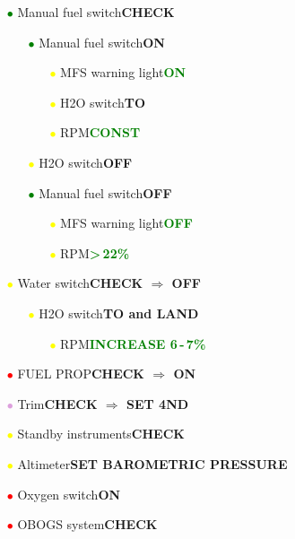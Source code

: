 \documentclass[a4paper,12pt,dvipsnames]{letter}
\newcommand{\button}[1]{\textbf{#1}}
\newcommand{\Deg}{\textdegree{}}
\newcommand{\ok}[1]{\textcolor{Green}{\textbf{#1}}}
\newcommand{\ri}{\textcolor{red}{$\bullet$\;}}
\newcommand{\gi}{\textcolor{Green}{$\bullet$\;}}
\newcommand{\yi}{\textcolor{Yellow}{$\bullet$\;}}
\newcommand{\vi}{\textcolor{Plum}{$\bullet$\;}}
\begin{document}
{\begin{itemize}
\begin{itemize}
\begin{itemize}
  \item[\yi] JPTL warning light\dotfill\ok{OFF}
 \end{itemize} 
\end{itemize}
\item[\gi] Manual fuel switch\dotfill\button{CHECK}
\begin{itemize}
 \item[\gi] Manual fuel switch\dotfill\button{ON}
 \begin{itemize}
  \item[\yi] MFS warning light\dotfill\ok{ON}
  \item[\yi] H2O switch\dotfill\button{TO}
  \item[\yi] RPM\dotfill\ok{CONST}
 \end{itemize}
 \item[\yi] H2O switch\dotfill\button{OFF}
 \item[\gi] Manual fuel switch\dotfill\button{OFF}
 \begin{itemize}
  \item[\yi] MFS warning light\dotfill\ok{OFF}
  \item[\yi] RPM\dotfill\ok{>\,22\%}
 \end{itemize}
\end{itemize}
\item[\yi] Water switch\dotfill\button{CHECK $\Rightarrow$ OFF}
\begin{itemize}
 \item[\yi] H2O switch\dotfill\button{TO and LAND}
 \begin{itemize}
 \item[\yi] RPM\dotfill\ok{INCREASE 6\,-\,7\%}
 \end{itemize}
\end{itemize}
\item[\ri] FUEL PROP\dotfill\button{CHECK $\Rightarrow$ ON}
\item[\vi] Trim\dotfill\button{CHECK $\Rightarrow$ SET 4\Deg\;ND}
\item[\yi] Standby instruments\dotfill\button{CHECK}
\item[\yi] Altimeter\dotfill\button{SET BAROMETRIC PRESSURE}
\item[\ri] Oxygen switch\dotfill\button{ON}
\item[\ri] OBOGS system\dotfill\button{CHECK}
\end{itemize}
}
\end{document}
